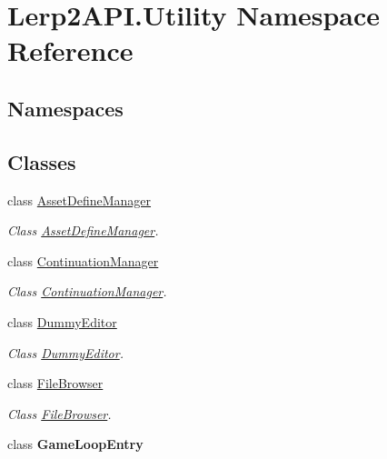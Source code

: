 \hypertarget{namespace_lerp2_a_p_i_1_1_utility}{}\section{Lerp2\+A\+P\+I.\+Utility Namespace Reference}
\label{namespace_lerp2_a_p_i_1_1_utility}
\subsection*{Namespaces}
\begin{DoxyCompactItemize}
\end{DoxyCompactItemize}
\subsection*{Classes}
\begin{DoxyCompactItemize}
\item 
class \hyperlink{class_lerp2_a_p_i_1_1_utility_1_1_asset_define_manager}{Asset\+Define\+Manager}
\begin{DoxyCompactList}\small\item\em Class \hyperlink{class_lerp2_a_p_i_1_1_utility_1_1_asset_define_manager}{Asset\+Define\+Manager}. \end{DoxyCompactList}\item 
class \hyperlink{class_lerp2_a_p_i_1_1_utility_1_1_continuation_manager}{Continuation\+Manager}
\begin{DoxyCompactList}\small\item\em Class \hyperlink{class_lerp2_a_p_i_1_1_utility_1_1_continuation_manager}{Continuation\+Manager}. \end{DoxyCompactList}\item 
class \hyperlink{class_lerp2_a_p_i_1_1_utility_1_1_dummy_editor}{Dummy\+Editor}
\begin{DoxyCompactList}\small\item\em Class \hyperlink{class_lerp2_a_p_i_1_1_utility_1_1_dummy_editor}{Dummy\+Editor}. \end{DoxyCompactList}\item 
class \hyperlink{class_lerp2_a_p_i_1_1_utility_1_1_file_browser}{File\+Browser}
\begin{DoxyCompactList}\small\item\em Class \hyperlink{class_lerp2_a_p_i_1_1_utility_1_1_file_browser}{File\+Browser}. \end{DoxyCompactList}\item 
class {\bfseries Game\+Loop\+Entry}

\end{DoxyCompactItemize}

